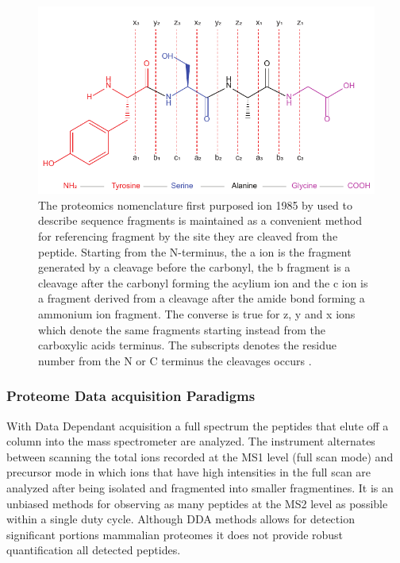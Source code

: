 \documentclass[a4paper]{book}
\begin{document}
	
	\begin{figure}
		\centering
		\includegraphics[width=0.6\linewidth]{3.Proteomics/peptide_frags.pdf}
		\caption{The proteomics nomenclature first purposed ion 1985 by \citep{Roepstorff1984LetterEditors} used to describe sequence fragments is maintained as a convenient method for referencing fragment by the site they are cleaved from the peptide. Starting from the N-terminus, the a ion is the fragment generated by a cleavage before the carbonyl, the b fragment is a cleavage after the carbonyl forming the acylium ion and the c ion is a fragment derived from a cleavage after the amide bond forming a ammonium ion fragment. The converse is true for z, y and x ions which denote the same fragments starting instead from the carboxylic acids terminus. The subscripts denotes the residue number from the N or C terminus the cleavages occurs \citep{Roepstorff1984LetterEditors}.}
		\label{Tri_peptide_seq}
	\end{figure}
	
	
	\subsubsection{Proteome Data acquisition Paradigms}
	
	With Data Dependant acquisition a full spectrum the peptides that elute off a column into the mass spectrometer are analyzed. The instrument alternates between scanning the total ions recorded at the MS1 level (full scan mode) and precursor mode in which ions that have high intensities in the full scan are analyzed after being isolated and fragmented into smaller fragmentines\citep{Bateman2014MaximizingDDA.}. It is an unbiased methods for observing as many peptides at the MS2 level as possible within a single duty cycle. Although DDA methods allows for detection significant portions mammalian proteomes it does not provide robust quantification all detected peptides\citep{Richards2015ProteomeDeep.}.
	
\end{document}
